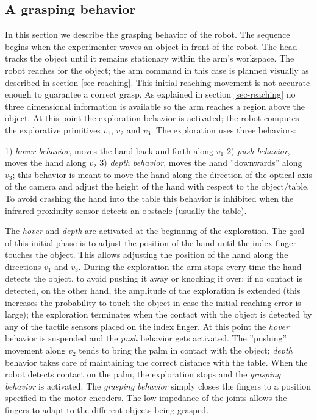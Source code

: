 \subsection{A grasping behavior}
In this section we describe the grasping behavior of the robot. The 
sequence begins when the experimenter waves an object in front of the 
robot. The head tracks the object until it remains stationary within 
the arm's workspace. The robot reaches for the object; the arm 
command in this case is planned visually as described in section 
\ref{sec-reaching}. This initial reaching movement is not accurate enough 
to guarantee a correct grasp. As explained in section \ref{sec-reaching} no 
three dimensional information is available so the arm reaches a region 
above the object. At this point the exploration behavior is activated; the 
robot computes the explorative primitives $v_1$, $v_2$ and $v_3$. The 
exploration uses three behaviors:

1) \emph{hover behavior}, moves the hand back and forth along $v_1$
2) \emph{push behavior}, moves the hand along $v_2$
3) \emph{depth behavior},  moves the hand ''downwards'' along $v_3$; this behavior is meant to 
move the hand along the direction of the optical axis of the camera and 
adjust the height of the hand with respect to the object/table. To avoid crashing the hand into the table this behavior is inhibited when the infrared proximity sensor detects an obstacle (usually the table).

The \emph{hover} and \emph{depth} are activated at the beginning of the exploration. The goal of this initial phase is to adjust the position of the 
hand until the index finger touches the object. This allows adjusting 
the position of the hand along the directions $v_1$ and $v_3$. During the 
exploration the arm stops every time the hand detects the object, to avoid 
pushing it away or knocking it over; if no contact is detected, on the 
other hand, the amplitude of the exploration is extended (this 
increases the probability to touch the object in case the initial 
reaching error is large); the exploration terminates when the contact with 
the object is detected by any of the tactile sensors placed on the index 
finger.
At this point the \emph{hover} behavior is suspended and the \emph{push} 
behavior gets activated. The ''pushing'' movement along $v_2$ 
tends to bring the palm in contact with the object; \emph{depth} 
behavior takes care of maintaining the correct 
distance with the table. When the robot detects contact on the palm, 
the exploration stops and the \emph{grasping behavior} is 
activated. The \emph{grasping behavior} simply closes the fingers to a 
position specified in the motor encoders. The low impedance of the 
joints allows the fingers to adapt to the different objects being grasped.

